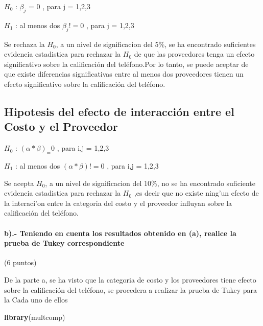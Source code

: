 \documentclass[]{article}
\newenvironment{Shaded}{\begin{snugshade}}{\end{snugshade}}
\newcommand{\KeywordTok}[1]{\textcolor[rgb]{0.13,0.29,0.53}{\textbf{#1}}}
\newcommand{\NormalTok}[1]{#1}
\let\oldparagraph\paragraph
\renewcommand{\paragraph}[1]{\oldparagraph{#1}\mbox{}}
\begin{document}
\(H_0\) : \(\beta_j\) = 0 , para j = 1,2,3

\(H_1\) : al menos dos \(\beta_j != 0\) , para j = 1,2,3

Se rechaza la \(H_0\), a un nivel de significacion del 5\%, se ha
encontrado suficientes evidencia estadistica para rechazar la \(H_0\) de
que las proveedores tenga un efecto significativo sobre la calificación
del teléfono.Por lo tanto, se puede aceptar de que existe diferencias
significativas entre al menos dos proveedores tienen un efecto
significativo sobre la calificación del teléfono.

\hypertarget{hipotesis-del-efecto-de-interaccion-entre-el-costo-y-el-proveedor}{%
\subsection{Hipotesis del efecto de interacción entre el Costo y el
Proveedor}\label{hipotesis-del-efecto-de-interaccion-entre-el-costo-y-el-proveedor}}

\(H_0\) : \((\alpha * \beta )_ = 0\) , para i,j = 1,2,3

\(H_1\) : al menos dos \((\alpha * \beta ) != 0\) , para i,j = 1,2,3

Se acepta \(H_0\), a un nivel de significacion del 10\%, no se ha
encontrado suficiente evidencia estadistica para rechazar la \(H_0\) ,es
decir que no existe ning'un efecto de la interaci'on entre la categoria
del costo y el proveedor influyan sobre la calificación del teléfono.

\hypertarget{b.--teniendo-en-cuenta-los-resultados-obtenido-en-a-realice-la-prueba-de-tukey-correspondiente}{%
\paragraph{b).- Teniendo en cuenta los resultados obtenido en (a),
realice la prueba de Tukey
correspondiente}\label{b.--teniendo-en-cuenta-los-resultados-obtenido-en-a-realice-la-prueba-de-tukey-correspondiente}}

(6 puntos)

De la parte a, se ha visto que la categoria de costo y los proveedores
tiene efecto sobre la calificación del teléfono, se procedera a realizar
la prueba de Tukey para la Cada uno de ellos

\begin{Shaded}
\begin{Highlighting}[]
\KeywordTok{library}\NormalTok{(multcomp)}
\end{Highlighting}
\end{Shaded}
\end{document}
